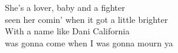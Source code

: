 \songwordfb{} She's a lover, baby and a fighter \\
 seen her comin' when it got a little brighter \\
\songwordfb{} With a name like Dani California \\
 was gonna come when I was gonna mourn ya \\


